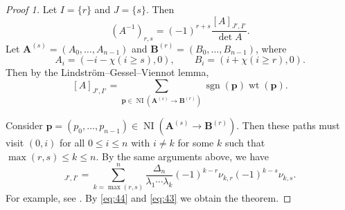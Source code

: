 \documentclass[oneside]{book}
\numberwithin{equation}{section}
\theoremstyle{definition}
\newcommand\NI{\operatorname{NI}}
\newcommand\sgn{\operatorname{sgn}}
\newcommand\wt{\operatorname{wt}}
\renewcommand\vec[1]{\bm{#1}}
\begin{document}
\begin{proof}[Proof 1]
  Let \( I=\{r\} \) and \( J=\{s\} \). Then
\begin{equation}\label{eq:44}
  (A^{-1})_{r,s} =(-1)^{r+s} \frac{[A]_{J', I'}}{\det A}.
\end{equation}
Let \( \vec A^{(s)} = (A_0,\dots,A_{n-1}) \) and
\( \vec B^{(r)} = (B_0,\dots,B_{n-1}) \), where
\[
  A_i = (-i-\chi(i\ge s),0), \qquad B_i = (i + \chi(i\ge r),0).
\]
Then by the Lindstr\"om--Gessel--Viennot lemma,
\[
[A]_{J', I'}  = \sum_{\vec p
    \in \NI(\vec A^{(s)} \to \vec B^{(r)})} \sgn(\vec p) \wt(\vec p).
\]

Consider \( \vec p =(p_0,\dots,p_{n-1}) \in \NI(\vec A^{(s)} \to \vec B^{(r)}) \).
Then these paths must visit \( (0,i) \) for all \( 0\le i\le n \) with
\( i\ne k \) for some \( k \) such that \( \max(r,s)\le k\le n \).
By the same arguments above, we have
\begin{equation}
 [A]\label{eq:43}_{J', I'} = \sum_{k=\max(r,s)}^{n} \frac{\Delta_n}{\lambda_1 \cdots \lambda_k}
 (-1)^{k-r} \nu_{k,r} (-1)^{k-s} \nu_{k,s}.
\end{equation}
For example, see . By \eqref{eq:44} and \eqref{eq:43} we
obtain the theorem.
\end{proof}
\end{document}
